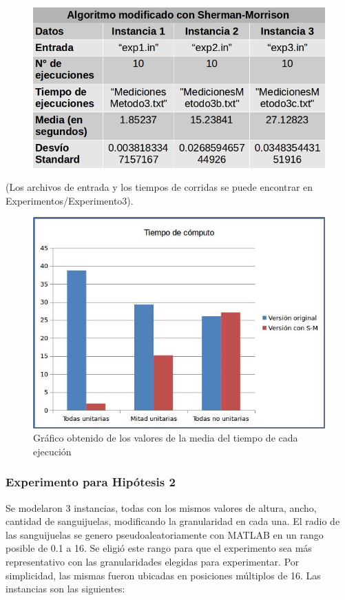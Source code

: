         
    \begin{figure}[H]
    \centering
    \includegraphics[scale=0.6]{graphs/tablaSherman.jpg}
    \end{figure}
        
        
 (Los archivos de entrada y los tiempos de corridas se puede encontrar en Experimentos/Experimento3).


    \begin{figure}[H]
    \centering
    \includegraphics[scale=0.6]{graphs/graficoExp1.jpg}\caption{Gráfico obtenido de los valores de la media del tiempo de cada ejecución}
    \end{figure}
    
    
    
\subsubsection{Experimento para Hipótesis 2}
    Se modelaron 3 instancias, todas con los mismos valores de altura, ancho, cantidad de sanguijuelas, modificando la granularidad en cada una. El radio de las sanguijuelas se genero pseudoaleatoriamente con MATLAB en un rango posible de 0.1 a 16. Se eligió este rango para que el experimento sea más representativo con las granularidades elegidas para experimentar. Por simplicidad, las mismas fueron ubicadas en posiciones múltiplos de 16. Las instancias son las siguientes:
    
